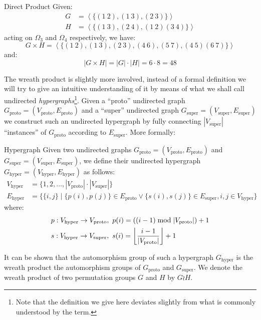\begin{exmp}[label=exmp:direct_product]{Direct Product}
  Given:
  \begin{align*}
    G &= \left<\{(1\ 2), (1\ 3), (2\ 3)\}\right> \\
    H &= \left<\{(1\ 3), (2\ 4), (1\ 2)(3\ 4)\}\right>
  \end{align*}
  acting on $\Omega_3$ and $\Omega_4$ respectively, we have:
  \begin{equation*}
    G \times H = \left<\{(1\ 2), (1\ 3), (2\ 3), (4\ 6), (5\ 7), (4\ 5)(6\ 7)\}\right>
  \end{equation*}
  and:
  \begin{equation*}
    |G \times H| = |G| \cdot |H| = 6 \cdot 8 = 48
  \end{equation*}
\end{exmp}
%
The wreath product is slightly more involved, instead of a formal definition we
will try to give an intuitive understanding of it by means of what we shall
call undirected \textit{hypergraphs}\footnote{Note that the definition we give
here deviates slightly from what is commonly understood by the term.}. Given a
``proto'' undirected graph $G_{\mathrm{proto}} = (V_{\mathrm{proto}},
E_{\mathrm{proto}})$ and a ``super'' undirected graph $G_{\mathrm{super}} =
(V_{\mathrm{super}}, E_{\mathrm{super}})$ we construct such an undirected
hypergraph by fully connecting $|V_{\mathrm{super}}|$ ``instances'' of
$G_{\mathrm{proto}}$ according to $E_{\mathrm{super}}$. More formally:

\begin{defn}[label=defn:hypergraph]{Hypergraph}
  Given two undirected graphs $G_{\mathrm{proto}} = (V_{\mathrm{proto}},
  E_{\mathrm{proto}})$ and $G_{\mathrm{super}} = (V_{\mathrm{super}},
  E_{\mathrm{super}})$, we define their undirected hypergraph $G_{\mathrm{hyper}}
  = (V_{\mathrm{hyper}}, E_{\mathrm{hyper}})$ as
  follows:
  \begin{align*}
    V_{\mathrm{hyper}} &= \{1,2,\dots,|V_{\mathrm{proto}}| \cdot |V_{\mathrm{super}}|\} \\
    E_{\mathrm{hyper}} &= \{\{i, j\} \mid \{p(i), p(j)\} \in E_{\mathrm{proto}}
                                     \lor \{s(i), s(j)\} \in E_{\mathrm{super}},
                                          i, j \in V_{\mathrm{hyper}}\}
  \end{align*}
  where:
  \begin{align*}
    &p: V_{\mathrm{hyper}} \rightarrow V_{\mathrm{proto}},\ 
        p(i) = ((i - 1) \bmod |V_{\mathrm{proto}}|) + 1 \\
    &s: V_{\mathrm{hyper}} \rightarrow V_{\mathrm{super}},\ 
        s(i) = \floor*{\frac{i - 1}{|V_{\mathrm{proto}}|}} + 1
  \end{align*}
\end{defn}
%
It can be shown that the automorphism group of such a hypergraph
$G_{\mathrm{hyper}}$ is the wreath product the automorphism groups of
$G_{\mathrm{proto}}$ and $G_{\mathrm{super}}$. We denote the wreath product of
two permutation groups $G$ and $H$ by $G \wr H$.

